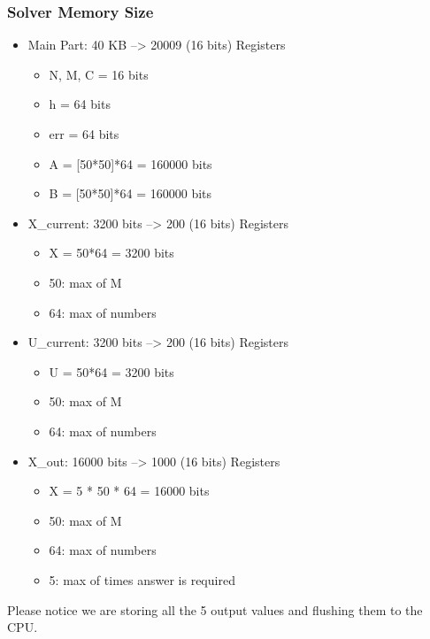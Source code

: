 \documentclass[12pt]{extarticle}
\begin{document}
\subsubsection{Solver Memory Size}
\begin{itemize}
    \item Main Part: 40 KB --> 20009 (16 bits) Registers
    \begin{itemize}
        \item N, M, C = 16 bits
        \item h = 64 bits
        \item err = 64 bits
        \item A = [50*50]*64 = 160000 bits
        \item B = [50*50]*64 = 160000 bits
    \end{itemize}
    \item X\_current: 3200 bits --> 200 (16 bits) Registers
    \begin{itemize}
        \item X = 50*64 = 3200 bits
        \item 50: max of M
        \item 64: max of numbers
    \end{itemize}
    \item U\_current: 3200 bits --> 200 (16 bits) Registers
    \begin{itemize}
        \item U = 50*64 = 3200 bits
        \item 50: max of M
        \item 64: max of numbers
    \end{itemize}
    \item X\_out: 16000 bits --> 1000 (16 bits) Registers
    \begin{itemize}
        \item X = 5 * 50 * 64 = 16000 bits
        \item 50: max of M
        \item 64: max of numbers
        \item 5: max of times answer is required
    \end{itemize}
\end{itemize}
Please notice we are storing all the 5 output values and flushing them to the CPU.
\end{document}
